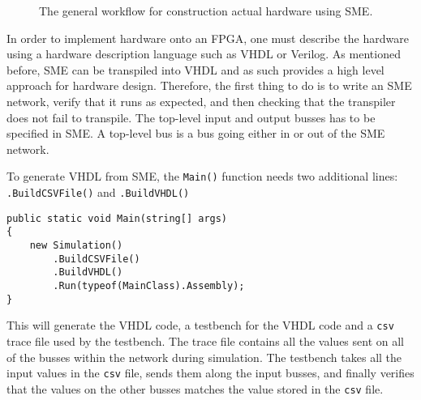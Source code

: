 \begin{figure}
    \caption{The general workflow for construction actual hardware using SME.}
    \label{fig:general-workflow}
\end{figure}
In order to implement hardware onto an FPGA, one must describe the hardware
using a hardware description language such as VHDL or Verilog. As mentioned
before, SME can be transpiled into VHDL and as such provides a high level
approach for hardware design. Therefore, the first thing to do is to write an
SME network, verify that it runs as expected, and then checking that the
transpiler does not fail to transpile. The top-level input and output busses has
to be specified in SME. A top-level bus is a bus going either in or out of the
SME network.

To generate VHDL from SME, the \texttt{Main()} function needs two additional
lines: \texttt{.BuildCSVFile()} and \texttt{.BuildVHDL()}
\begin{lstlisting}
public static void Main(string[] args)
{
    new Simulation()
        .BuildCSVFile()
        .BuildVHDL()
        .Run(typeof(MainClass).Assembly);
}
\end{lstlisting}
This will generate the VHDL code, a testbench for the VHDL code and a
\texttt{csv} trace file used by the testbench. The trace file contains all the
values sent on all of the busses within the network during simulation. The
testbench takes all the input values in the \texttt{csv} file, sends them along
the input busses, and finally verifies that the values on the other busses
matches the value stored in the \texttt{csv} file.

